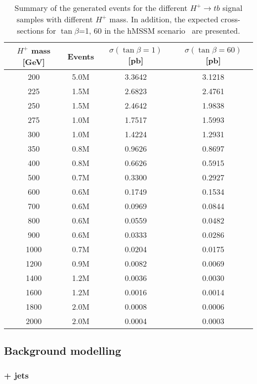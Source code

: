 \begin{table}[htbp]
    \small	
    \begin{tabular}{cccc}
    \toprule\toprule
    $H^+$ mass [GeV] & Events & $\sigma(\tan\beta=1)$ [pb] &  $\sigma(\tan\beta=60)$ [pb] \\ \midrule
    200 & 5.0M & 3.3642 & 3.1218 \\
    225 & 1.5M & 2.6823 & 2.4761 \\
    250 & 1.5M & 2.4642 & 1.9838 \\
    275 & 1.0M & 1.7517 & 1.5993 \\
    300 & 1.0M & 1.4224 & 1.2931 \\
    350 & 0.8M & 0.9626 & 0.8697 \\
    400 & 0.8M & 0.6626 & 0.5915 \\
    500 & 0.7M & 0.3300 & 0.2927 \\
    600 & 0.6M & 0.1749 & 0.1534 \\
    700 & 0.6M & 0.0969 & 0.0844 \\
    800 & 0.6M & 0.0559 & 0.0482 \\
    900 & 0.6M & 0.0333 & 0.0286 \\
    1000 & 0.7M & 0.0204 & 0.0175 \\
    1200 & 0.9M & 0.0082 & 0.0069 \\
    1400 & 1.2M & 0.0036 & 0.0030 \\
    1600 & 1.2M & 0.0016 & 0.0014 \\
    1800 & 2.0M & 0.0008 & 0.0006 \\
    2000 & 2.0M & 0.0004 & 0.0003 \\
    \bottomrule\bottomrule  
    \end{tabular}                            
    \caption{Summary of the generated events for the different $H^+\to tb$ signal samples with different $H^+$ mass. In addition, the expected cross-sections for $\tan\beta$=1, 60 in the hMSSM scenario~\cite{Akeroyd2017} are presented.}
    \label{Hplustb:signalsummarytable}
\end{table}

\clearpage

\subsection{Background modelling}

\subsubsection{\ttbar+ jets}

